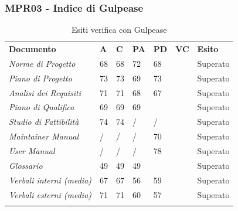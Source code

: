 \subsubsection{MPR03 - Indice di Gulpease}
\begin{center}
    \centering
    \renewcommand{\arraystretch}{1.8}
    \label{tab:IndiciGulpease}
    \begin{longtable}[!h]{p{100px} p{50px} p{50px} p{50px} p{50px} p{50px} p{50px}}
        \caption{Esiti verifica con Gulpease}                                                                                        \\
        \rowcolor{logo!70}   \textbf{Documento} & \textbf{A} & \textbf{C} & \textbf{PA} & \textbf{PD} & \textbf{VC} & \textbf{Esito} \\
        \textit{Norme di Progetto}              & 68         & 68         & 72          & 68          &             & Superato       \\
        \textit{Piano di Progetto}              & 73         & 73         & 69          & 73          &             & Superato       \\
        \textit{Analisi dei Requisiti}          & 71         & 71         & 68          & 67          &             & Superato       \\
        \textit{Piano di Qualifica}             & 69         & 69         & 69          &             &             & Superato       \\
        \textit{Studio di Fattibilità}          & 74         & 74         & /           & /           &             & Superato       \\
        \textit{Maintainer Manual}              & /          & /          & /           & 70          &             & Superato       \\
        \textit{User Manual}                    & /          & /          & /           & 78          &             & Superato       \\
        \textit{Glossario}                      & 49         & 49         & 49          &             &             & Superato       \\
        \textit{Verbali interni (media)}        & 67         & 67         & 56          & 59          &             & Superato       \\
        \textit{Verbali esterni (media)}        & 71         & 71         & 60          & 57          &             & Superato       \\
        \rowcolor{white}
    \end{longtable}
\end{center}
